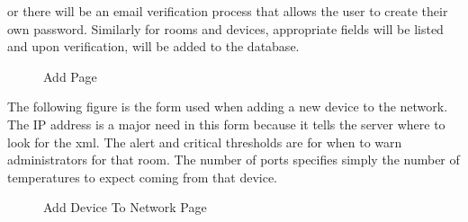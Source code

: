 \documentclass{report}
\begin{document}
or there will be an email verification process that allows the user to create their own password. 
Similarly for rooms and devices, appropriate fields will be listed and upon verification, will be added to the database. 
\begin{figure}[H]
\caption{Add Page}
\end{figure}
The following figure is the form used when adding a new device to the network.
The IP address is a major need in this form because it tells the server where to look for the xml. 
The alert and critical thresholds are for when to warn administrators for that room.
The number of ports specifies simply the number of temperatures to expect coming from that device.

\begin{figure}[H]
\caption{Add Device To Network Page}
\end{figure}
\end{document}
